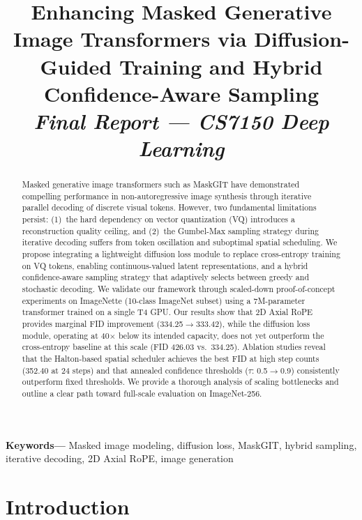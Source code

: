\documentclass[conference]{IEEEtran}
\begin{document}
\title{Enhancing Masked Generative Image Transformers via Diffusion-Guided Training and Hybrid Confidence-Aware Sampling\\
\large \textit{Final Report --- CS7150 Deep Learning}}

\author{}

\maketitle

\begin{abstract}
Masked generative image transformers such as MaskGIT have demonstrated compelling performance in non-autoregressive image synthesis through iterative parallel decoding of discrete visual tokens. However, two fundamental limitations persist: (1)~the hard dependency on vector quantization (VQ) introduces a reconstruction quality ceiling, and (2)~the Gumbel-Max sampling strategy during iterative decoding suffers from token oscillation and suboptimal spatial scheduling. We propose integrating a lightweight diffusion loss module to replace cross-entropy training on VQ tokens, enabling continuous-valued latent representations, and a hybrid confidence-aware sampling strategy that adaptively selects between greedy and stochastic decoding. We validate our framework through scaled-down proof-of-concept experiments on ImageNette (10-class ImageNet subset) using a 7M-parameter transformer trained on a single T4 GPU. Our results show that 2D Axial RoPE provides marginal FID improvement (334.25$\to$333.42), while the diffusion loss module, operating at 40$\times$ below its intended capacity, does not yet outperform the cross-entropy baseline at this scale (FID 426.03 vs.\ 334.25). Ablation studies reveal that the Halton-based spatial scheduler achieves the best FID at high step counts (352.40 at 24 steps) and that annealed confidence thresholds ($\tau$: 0.5$\to$0.9) consistently outperform fixed thresholds. We provide a thorough analysis of scaling bottlenecks and outline a clear path toward full-scale evaluation on ImageNet-256.
\end{abstract}

\noindent\textbf{Keywords---} Masked image modeling, diffusion loss, MaskGIT, hybrid sampling, iterative decoding, 2D Axial RoPE, image generation

\section{Introduction}
\end{document}
